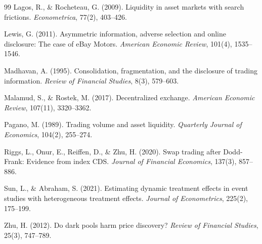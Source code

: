 \documentclass[12pt]{article}
\begin{document}
\begin{thebibliography}{99}
Lagos, R., \& Rocheteau, G. (2009). Liquidity in asset markets with search frictions. \textit{Econometrica}, 77(2), 403--426.

Lewis, G. (2011). Asymmetric information, adverse selection and online disclosure: The case of eBay Motors. \textit{American Economic Review}, 101(4), 1535--1546.

Madhavan, A. (1995). Consolidation, fragmentation, and the disclosure of trading information. \textit{Review of Financial Studies}, 8(3), 579--603.

Malamud, S., \& Rostek, M. (2017). Decentralized exchange. \textit{American Economic Review}, 107(11), 3320--3362.

Pagano, M. (1989). Trading volume and asset liquidity. \textit{Quarterly Journal of Economics}, 104(2), 255--274.

Riggs, L., Onur, E., Reiffen, D., \& Zhu, H. (2020). Swap trading after Dodd-Frank: Evidence from index CDS. \textit{Journal of Financial Economics}, 137(3), 857--886.

Sun, L., \& Abraham, S. (2021). Estimating dynamic treatment effects in event studies with heterogeneous treatment effects. \textit{Journal of Econometrics}, 225(2), 175--199.

Zhu, H. (2012). Do dark pools harm price discovery? \textit{Review of Financial Studies}, 25(3), 747--789.

\end{thebibliography}
\end{document}
